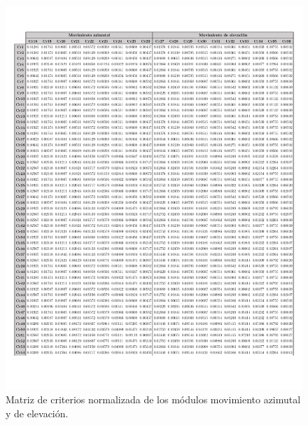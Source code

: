 \newpage
\begin{figure}[H]
	\centering
	\includegraphics[width=15.5cm]{imagenes/MNormalizada2Ex}
	\caption{Matriz de criterios normalizada de los módulos movimiento azimutal y de elevación.}
	\label{fig:MNormalizada2Ex}
\end{figure}

